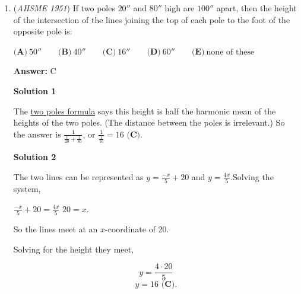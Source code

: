 \begin{enumerate}
 $\textbf{(A)}\ \text{the ratio of two sides and the inc{}luded angle}\\ \qquad\textbf{(B)}\ \text{the ratios of the three altitudes}\\ \qquad\textbf{(C)}\ \text{the ratios of the three medians}\\ \qquad\textbf{(D)}\ \text{the ratio of the altitude to the corresponding base}\\ \qquad\textbf{(E)}\ \text{two angles}$

 \textbf{Answer: }D



\textbf{Solution}

The answer is $\boxed{\textbf{(D)}}$. The ratio of the altitude to the base is insufficient to determine the shape of a triangle; you also need to know the ratio of the two segments into which the altitude divides the base.

 


	\item (\textit{AHSME 1951}) If two poles $20''$ and $80''$ high are $100''$ apart, then the height of the intersection of the lines joining the top of each pole to the foot of the opposite pole is: 


 $\textbf{(A)}\ 50''\qquad\textbf{(B)}\ 40''\qquad\textbf{(C)}\ 16''\qquad\textbf{(D)}\ 60''\qquad\textbf{(E)}\ \text{none of these}$

 \textbf{Answer: }C



\textbf{Solution 1}

The \href{https://artofproblemsolving.com/wiki/index.php?title=Two\_poles\_formula}{two poles formula} says this height is half the harmonic mean of the heights of the two poles. (The distance between the poles is irrelevant.) So the answer is $\frac1{\frac1{20}+\frac1{80}}$, or $\frac1{\frac1{16}}=\boxed{16 \textbf{ (C)}}$.

 



\textbf{Solution 2}

The two lines can be represented as $y=\frac{-x}{5}+20$ and $y=\frac{4x}{5}$.Solving the system,

 $\frac{-x}{5}+20=\frac{4x}{5}$
$20=x.$

 So the lines meet at an $x$-coordinate of 20.

 Solving for the height they meet,

 
 \[y=\frac{4\cdot 20}{5}\]
 \[y=\boxed{16 \textbf{ (C)}}.\]




\end{enumerate}
